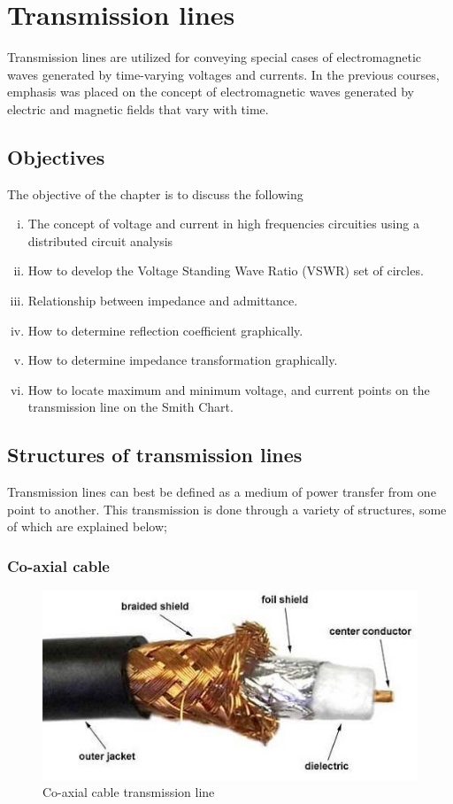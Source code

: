 \chapter{Transmission lines}\label{lec:lec2}
Transmission lines are utilized for conveying special cases of electromagnetic waves generated by time-varying voltages and currents. In the previous courses, emphasis was placed on the concept of electromagnetic waves generated by electric and magnetic fields that vary with time.

\section{Objectives}
The objective of the chapter is to discuss the following
\begin{enumerate}[(i)]
\item The concept of voltage and current in high frequencies circuities using a distributed circuit analysis
\item How to develop the Voltage Standing Wave Ratio (VSWR) set of circles.
\item Relationship between impedance and admittance.
\item How to determine reflection coefficient graphically.
\item How to determine impedance transformation graphically.
\item How to locate maximum and minimum voltage, and current points on the transmission line on the Smith Chart.
\end{enumerate}

\section{Structures of transmission lines}

Transmission lines can best be defined as a medium of power transfer from one point to another. This transmission is done through a variety of structures, some of which are explained below;

\subsection{Co-axial cable}	
\begin{figure}[h]
\centering
\includegraphics[scale=0.65]{./graphics/coaxial}
\caption{Co-axial cable transmission line}
\label{fig:coaxial}
\end{figure}

